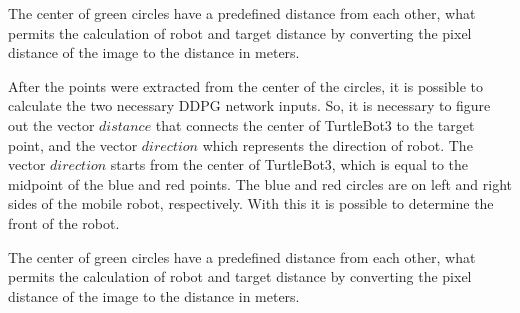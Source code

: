 The center of green circles have a predefined distance from each other, what permits the calculation of robot and target distance by converting the pixel distance of the image to the distance in meters.





After the points were extracted from the center of the circles, it is possible to calculate the two necessary DDPG network inputs.
So, it is necessary to figure out the vector $distance$ that connects the center of TurtleBot3 to the target point, and the vector $direction$ which represents the direction of robot.
The vector $direction$ starts from the center of TurtleBot3, which is equal to the midpoint of the blue and red points.
The blue and red circles are on left and right sides of the mobile robot, respectively.
With this it is possible to determine the front of the robot.

The center of green circles have a predefined distance from each other, what permits the calculation of robot and target distance by converting the pixel distance of the image to the distance in meters.






